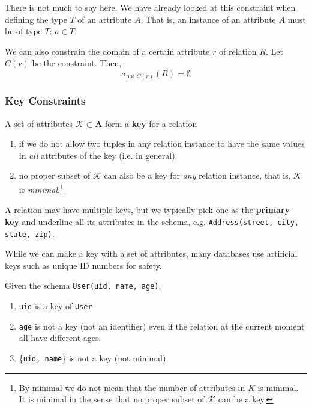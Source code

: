 \documentclass{article}
\begin{document}
      There is not much to say here. We have already looked at this constraint when defining the type $T$ of an attribute $A$. That is, an instance of an attribute $A$ must be of type $T$: $a \in T$. 

      \begin{definition}
        We can also constrain the domain of a certain attribute $r$ of relation $R$. Let $C(r)$ be the constraint. Then, 
        \begin{equation}
          \sigma_{\text{not } C(r)} (R) = \emptyset
        \end{equation}
      \end{definition}

    \subsubsection{Key Constraints}

      \begin{definition}[Key]
        A set of attributes $\mathcal{K} \subset \mathbf{A}$ form a \textbf{key} for a relation 
        \begin{enumerate}
          \item if we do not allow two tuples in any relation instance to have the same values in \textit{all} attributes of the key (i.e. in general). 
          \item no proper subset of $\mathcal{K}$ can also be a key for \textit{any} relation instance, that is, $\mathcal{K}$ is \textit{minimal}.\footnote{By minimal we do not mean that the number of attributes in $K$ is minimal. It is minimal in the sense that no proper subset of $\mathcal{K}$ can be a key.}
        \end{enumerate}
        A relation may have multiple keys, but we typically pick one as the \textbf{primary key} and underline all its attributes in the schema, e.g. \texttt{Address(\underline{street}, city, state, \underline{zip})}. 
      \end{definition}

      While we can make a key with a set of attributes, many databases use artificial keys such as unique ID numbers for safety. 

      \begin{example}
        Given the schema \texttt{User(uid, name, age)}, 
        \begin{enumerate}
          \item \texttt{uid} is a key of \texttt{User} 
          \item \texttt{age} is not a key (not an identifier) even if the relation at the current moment all have different ages. 
          \item \{\texttt{uid, name}\} is not a key (not minimal)
        \end{enumerate}
      \end{example}
\end{document}
